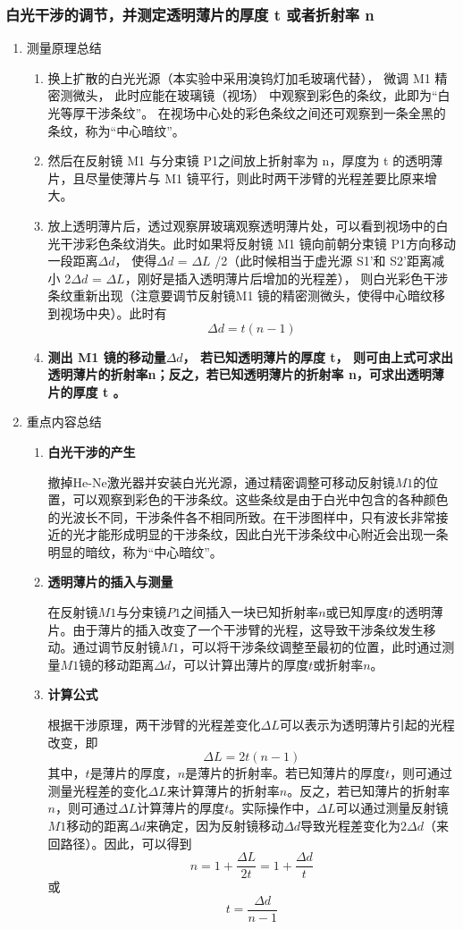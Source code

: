 \documentclass[dvipsnames, svgnames,a4paper,11pt]{article}
\begin{document}
	\subsubsection{白光干涉的调节，并测定透明薄片的厚度 t 或者折射率 n}
	\begin{enumerate}
		\item 测量原理总结
		\begin{enumerate}
			\item 换上扩散的白光光源（本实验中采用溴钨灯加毛玻璃代替）， 微调 M1 精密测微头， 此时应能在玻璃镜（视场） 中观察到彩色的条纹，此即为“白光等厚干涉条纹”。 在视场中心处的彩色条纹之间还可观察到一条全黑的条纹，称为“中心暗纹”。
			\item 然后在反射镜 M1 与分束镜 P1之间放上折射率为 n，厚度为 t 的透明薄片，且尽量使薄片与 M1 镜平行，则此时两干涉臂的光程差要比原来增大。
			\item 放上透明薄片后，透过观察屏玻璃观察透明薄片处，可以看到视场中的白光干涉彩色条纹消失。此时如果将反射镜 M1 镜向前朝分束镜 P1方向移动一段距离$\Delta d$， 使得$\Delta d$ = $\Delta L$ /2（此时候相当于虚光源 S1’和 S2’距离减小 2$\Delta d$ = $\Delta L$，刚好是插入透明薄片后增加的光程差）， 则白光彩色干涉条纹重新出现（注意要调节反射镜M1 镜的精密测微头，使得中心暗纹移到视场中央）。此时有
			\[\Delta d=t(n-1)\]
			\item \textbf{测出 M1 镜的移动量$\Delta d$， 若已知透明薄片的厚度 t， 则可由上式可求出透明薄片的折射率n；反之，若已知透明薄片的折射率 n，可求出透明薄片的厚度 t 。}
		\end{enumerate}
		
		\item 重点内容总结
		\begin{enumerate}
			\item \textbf{白光干涉的产生}
			
			撤掉He-Ne激光器并安装白光光源，通过精密调整可移动反射镜$M1$的位置，可以观察到彩色的干涉条纹。这些条纹是由于白光中包含的各种颜色的光波长不同，干涉条件各不相同所致。在干涉图样中，只有波长非常接近的光才能形成明显的干涉条纹，因此白光干涉条纹中心附近会出现一条明显的暗纹，称为“中心暗纹”。
			
			\item \textbf{透明薄片的插入与测量}
			
			在反射镜$M1$与分束镜$P1$之间插入一块已知折射率$n$或已知厚度$t$的透明薄片。由于薄片的插入改变了一个干涉臂的光程，这导致干涉条纹发生移动。通过调节反射镜$M1$，可以将干涉条纹调整至最初的位置，此时通过测量$M1$镜的移动距离$\Delta d$，可以计算出薄片的厚度$t$或折射率$n$。
			
			\item \textbf{计算公式}
			
			根据干涉原理，两干涉臂的光程差变化$\Delta L$可以表示为透明薄片引起的光程改变，即
			\[ \Delta L = 2t(n-1) \]
			其中，$t$是薄片的厚度，$n$是薄片的折射率。若已知薄片的厚度$t$，则可通过测量光程差的变化$\Delta L$来计算薄片的折射率$n$。反之，若已知薄片的折射率$n$，则可通过$\Delta L$计算薄片的厚度$t$。实际操作中，$\Delta L$可以通过测量反射镜$M1$移动的距离$\Delta d$来确定，因为反射镜移动$\Delta d$导致光程差变化为$2\Delta d$（来回路径）。因此，可以得到
			\[ n = 1 + \frac{\Delta L}{2t} = 1 + \frac{\Delta d}{t} \]
			或
			\[ t = \frac{\Delta d}{n-1} \]
		\end{enumerate}
	\end{enumerate}
\end{document}
